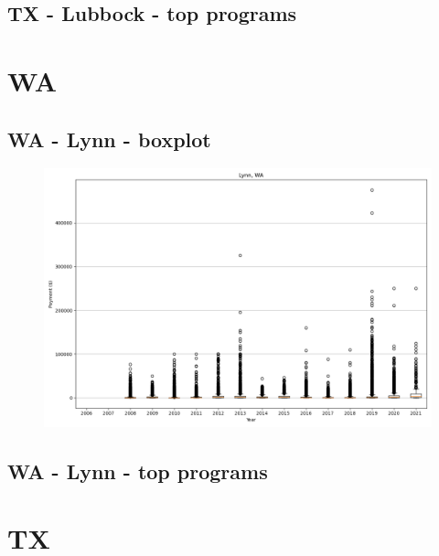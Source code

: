 \subsection*{TX - Lubbock - top programs}

\newpage
\section*{WA}
\subsection*{WA - Lynn - boxplot}
\begin{figure}[h]
\centering
\includegraphics[width=7in]{../output/boxplots/counties/Lynn-WA_boxplot.png}
\end{figure}


\subsection*{WA - Lynn - top programs}

\newpage
\section*{TX}
